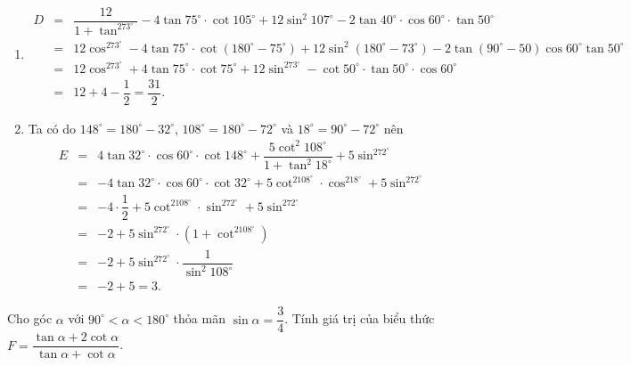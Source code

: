\begin{bt}
{\begin{enumerate}
	\item 
	\allowdisplaybreaks
	\begin{eqnarray*}
		D&=& \dfrac{12}{1+\tan^273^\circ} -4\tan 75^\circ\cdot\cot 105^\circ+12\sin^2 107^\circ-2 \tan 40^\circ \cdot \cos 60^\circ \cdot \tan 50^\circ\\
		&=&12\cos^273^\circ-4\tan75^\circ\cdot\cot(180^\circ-75^\circ)+12\sin^2(180^\circ-73^\circ)-2\tan(90^\circ-50)\cos60^\circ\tan 50^\circ\\
		&=&12\cos^273^\circ+4\tan75^\circ\cdot\cot75^\circ+12\sin^273^\circ-\cot 50^\circ\cdot \tan 50^\circ\cdot \cos 60^\circ\\
		&=&12+4-\dfrac{1}{2}=\dfrac{31}{2}.
	\end{eqnarray*}
	\item Ta có do $148^\circ=180^\circ-32^\circ$, $108^\circ=180^\circ-72^\circ$ và $18^\circ=90^\circ-72^\circ$ nên
	\allowdisplaybreaks
	\begin{eqnarray*}
		E&=&4 \tan 32^\circ \cdot \cos 60^\circ \cdot \cot 148^\circ+\dfrac{5 \cot^2 108^\circ}{1+\tan^2 18^\circ}+5\sin^272^\circ\\
		&=&-4 \tan 32^\circ \cdot \cos 60^\circ \cdot \cot 32^\circ+5\cot^2108^\circ\cdot\cos^218^\circ+5\sin^272^\circ\\
		&=&-4\cdot\dfrac{1}{2}+5\cot^2108^\circ\cdot\sin^272^\circ+5\sin^272^\circ\\
		&=&-2+5\sin^272^\circ\cdot\left(1+\cot^2108^\circ\right)\\
		&=&-2+5\sin^272^\circ\cdot \dfrac{1}{\sin^2 108^\circ}\\
		&=&-2+5=3.
	\end{eqnarray*}
\end{enumerate}	
}
\end{bt}

\begin{bt}%
Cho góc $\alpha$ với $90^\circ<\alpha<180^\circ$ thỏa mãn $\sin\alpha=\dfrac{3}{4}$. Tính giá trị của biểu thức $F=\dfrac{\tan\alpha+2\cot\alpha}{\tan\alpha+\cot\alpha}$.
\end{bt}


